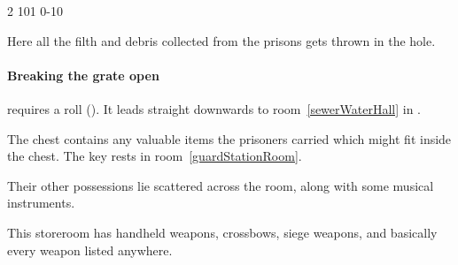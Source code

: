 \begin{multicols}{2}
%
  {{1}{0}{1}}%
  {{0}{-1}{0}}%
  {%
  }%
  {}%
  {\lootSmall}%
  {\label{spyBroth}}%

\null

Here all the filth and debris collected from the prisons gets thrown in the hole.

\paragraph{Breaking the grate open}
requires a  roll (\tn[10]).
It leads straight downwards to room~\vref{sewerWaterHall} in .

\null


The chest contains any valuable items the prisoners carried which might fit inside the chest.
The key rests in room~\ref{guardStationRoom}.

Their other possessions lie scattered across the room, along with some musical instruments.


This storeroom has handheld weapons, \glspl{crossbow}, siege weapons, and basically every weapon listed anywhere.%

\end{multicols}

